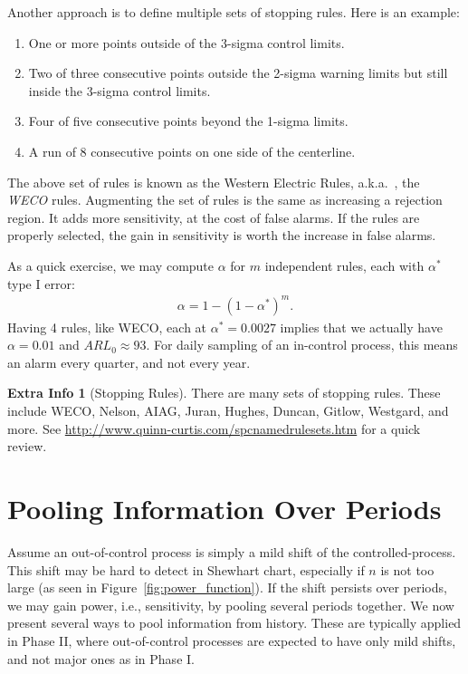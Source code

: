 \documentclass[12pt,a4paper]{report}
\theoremstyle{plain}
\theoremstyle{definition}
\newtheorem{extra}{Extra Info}
\newcommand{\aka}{{a.k.a.\ }}
\begin{document}
Another approach is to define multiple sets of stopping rules.
Here is an example:
\begin{enumerate}
\item One or more points outside of the 3-sigma control limits.
\item Two of three consecutive points outside the 2-sigma warning limits but still inside the 3-sigma control limits.
\item Four of five consecutive points beyond the 1-sigma limits.
\item A run of 8 consecutive points on one side of the centerline.
\end{enumerate}
The above set of rules is known as the Western Electric Rules, \aka, the \emph{WECO} rules.
Augmenting the set of rules is the same as increasing a rejection region. It adds more sensitivity, at the cost of false alarms. If the rules are properly selected, the gain in sensitivity is worth the increase in false alarms.

As a quick exercise, we may compute $\alpha$  for $m$ independent rules, each with $\alpha^*$ type I error:
\begin{align}
\label{eq:multiplicity_in_spc}
	\alpha=1-(1-\alpha^*)^m.
\end{align}
Having 4 rules, like WECO, each at $\alpha^*=0.0027$ implies that we actually have $\alpha=0.01$ and $ARL_0 \approx 93$. For daily sampling of an in-control process, this means an alarm every quarter, and not every year. 

\begin{extra}[Stopping Rules]
There are many sets of stopping rules. 
These include WECO, Nelson, AIAG, Juran, Hughes, Duncan, Gitlow, Westgard, and more. 
See \url{http://www.quinn-curtis.com/spcnamedrulesets.htm} for a quick review.
\end{extra}






\section{Pooling Information Over Periods}
\label{sec:running_windows}

Assume an out-of-control process is simply a mild shift of the controlled-process.
This shift may be hard to detect in Shewhart chart, especially if $n$ is not too large (as seen in Figure~\ref{fig:power_function}).  
If the shift persists over periods, we may gain power, i.e., sensitivity, by pooling several periods together. 
We now present several ways to pool information from history. These are typically applied in Phase II, where out-of-control processes are expected to have only mild shifts, and not major ones as in Phase I. 
\end{document}
